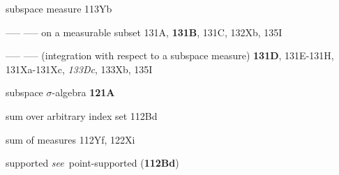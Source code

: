 




















subspace measure 113Yb  

----- -----  on a measurable subset 131A, {\bf 131B}, 131C, 132Xb,
135I  

----- -----  (integration with respect to a subspace measure) {\bf 131D},
131E-131H, 
131Xa-131Xc, 
{\it 133Dc}, 133Xb, 135I







subspace $\sigma$-algebra {\bf 121A}












sum over arbitrary index set 112Bd

sum of measures 112Yf, 122Xi


























{supported {\it see}}\
point-supported ({\bf 112Bd})
































